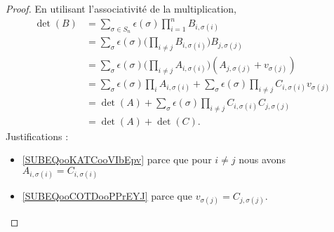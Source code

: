 \begin{proof}
	En utilisant l'associativité de la multiplication,
	\begin{subequations}
		\begin{align}
			\det(B) & =\sum_{\sigma\in S_n}\epsilon(\sigma)\prod_{i=1}^n B_{i,\sigma(i)}                                                                                                \\
			        & =\sum_{\sigma}\epsilon(\sigma)\big( \prod_{i\neq j}B_{i,\sigma(i)} \big)B_{j,\sigma(j)}                                                                           \\
			        & =\sum_{\sigma}\epsilon(\sigma)\big( \prod_{i\neq j}A_{i,\sigma(i)} \big)(A_{j,\sigma(j)}+v_{\sigma(j)})                                                           \\
			        & =\sum_{\sigma}\epsilon(\sigma)\prod_i A_{i,\sigma(i)}+\sum_{\sigma}\epsilon(\sigma)\prod_{i\neq j}C_{i,\sigma(i)}v_{\sigma(j)}        \label{SUBEQooKATCooVIbEpv} \\
			        & =\det(A)+\sum_{\sigma}\epsilon(\sigma)\prod_{i\neq j}C_{i,\sigma(i)}C_{j,\sigma(j)}                                                   \label{SUBEQooCOTDooPPrEYJ} \\
			        & =\det(A)+\det(C).
		\end{align}
	\end{subequations}
	Justifications :
	\begin{itemize}
		\item \ref{SUBEQooKATCooVIbEpv} parce que pour \( i\neq j\) nous avons \( A_{i,\sigma(i)}=C_{i,\sigma(i)}\)
		\item \ref{SUBEQooCOTDooPPrEYJ} parce que \( v_{\sigma(j)}=C_{j,\sigma(j)}\).
	\end{itemize}
\end{proof}

